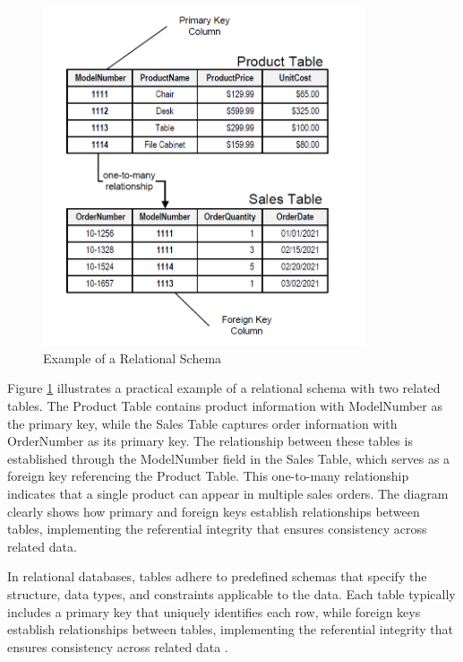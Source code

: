 \begin{figure}[ht]
    \centering
    \includegraphics[width=0.85\textwidth]{figures/relational_schema.png}
    \caption{Example of a Relational Schema \cite{noah2024relational}}
    \label{fig:relational-schema}
\end{figure}

Figure \ref{fig:relational-schema} illustrates a practical example of a relational schema with two related tables. The Product Table contains product information with ModelNumber as the primary key, while the Sales Table captures order information with OrderNumber as its primary key. The relationship between these tables is established through the ModelNumber field in the Sales Table, which serves as a foreign key referencing the Product Table. This one-to-many relationship indicates that a single product can appear in multiple sales orders. The diagram clearly shows how primary and foreign keys establish relationships between tables, implementing the referential integrity that ensures consistency across related data.

In relational databases, tables adhere to predefined schemas that specify the structure, data types, and constraints applicable to the data. Each table typically includes a primary key that uniquely identifies each row, while foreign keys establish relationships between tables, implementing the referential integrity that ensures consistency across related data \cite{elmasri2015fundamentals}.

